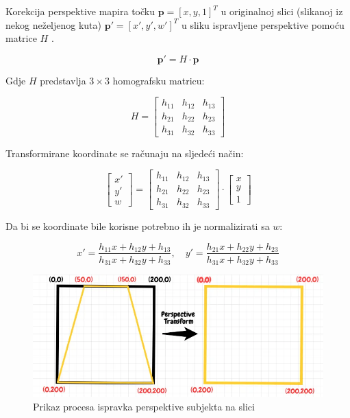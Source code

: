 \documentclass{foi}
\begin{document}
Korekcija perspektive mapira točku \( \mathbf{p} = [x, y, 1]^T \) u originalnoj slici (slikanoj iz nekog neželjenog kuta) \( \mathbf{p'} = [x', y', w']^T \) u sliku ispravljene perspektive pomoću matrice \( H \) \cite{OpenCvPerpsective}.

\[
\mathbf{p'} = H \cdot \mathbf{p}
\]

Gdje \( H \) predstavlja \( 3 \times 3 \) homografsku matricu:

\[
H = 
\begin{bmatrix}
h_{11} & h_{12} & h_{13} \\
h_{21} & h_{22} & h_{23} \\
h_{31} & h_{32} & h_{33}
\end{bmatrix}
\]

Transformirane koordinate se računaju na sljedeći način:

\[
\begin{bmatrix}
x' \\
y' \\
w
\end{bmatrix}
=
\begin{bmatrix}
h_{11} & h_{12} & h_{13} \\
h_{21} & h_{22} & h_{23} \\
h_{31} & h_{32} & h_{33}
\end{bmatrix}
\cdot
\begin{bmatrix}
x \\
y \\
1
\end{bmatrix}
\]

Da bi se koordinate bile korisne potrebno ih je normalizirati sa \( w \):

\[
x' = \frac{h_{11}x + h_{12}y + h_{13}}{h_{31}x + h_{32}y + h_{33}}, \quad
y' = \frac{h_{21}x + h_{22}y + h_{23}}{h_{31}x + h_{32}y + h_{33}}
\]

\begin{figure}[H]
    \centering
    \includegraphics[width=0.85\linewidth]{slike/perspective.png}
    \caption{Prikaz procesa ispravka perspektive subjekta na slici \cite{OpenCvPerpsective}}
\end{figure}
\end{document}
